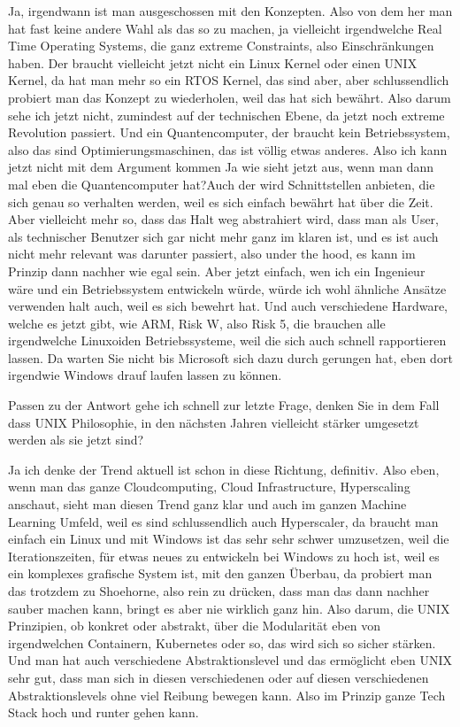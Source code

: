 \begin{description}
\NH Ja, irgendwann ist man ausgeschossen mit den Konzepten. Also von dem her man hat fast keine andere Wahl als das so zu  machen, ja vielleicht irgendwelche Real Time Operating Systems, die ganz extreme Constraints, also Einschränkungen haben. Der braucht vielleicht jetzt nicht ein Linux Kernel oder einen UNIX Kernel, da hat man mehr so ein RTOS Kernel, das sind aber, aber schlussendlich probiert man das Konzept zu wiederholen, weil das hat sich bewährt. Also darum sehe ich jetzt nicht, zumindest auf der technischen Ebene, da jetzt noch extreme Revolution passiert. Und ein Quantencomputer, der braucht kein Betriebssystem, also das sind Optimierungsmaschinen, das ist völlig etwas anderes. Also ich kann jetzt nicht mit dem Argument kommen \glqq Ja wie sieht jetzt aus, wenn man dann mal eben die Quantencomputer hat?\grqq Auch der wird Schnittstellen anbieten, die sich genau so verhalten werden, weil es sich einfach bewährt hat über die Zeit. Aber vielleicht mehr so, dass das Halt weg abstrahiert wird, dass man als User, als technischer Benutzer sich gar nicht mehr ganz im klaren ist, und es ist auch nicht mehr relevant was darunter passiert, also under the hood, es kann im Prinzip dann nachher wie egal sein. Aber jetzt einfach, wen ich ein Ingenieur wäre und ein Betriebssystem entwickeln würde, würde ich wohl ähnliche Ansätze verwenden halt auch, weil es sich bewehrt hat. Und auch verschiedene Hardware, welche es jetzt gibt, wie ARM, Risk W, also Risk 5, die brauchen alle irgendwelche Linuxoiden Betriebssysteme, weil die sich auch schnell rapportieren lassen. Da warten Sie nicht bis Microsoft sich dazu durch gerungen hat, eben dort irgendwie Windows drauf laufen lassen zu können.

\DS Passen zu der Antwort gehe ich schnell zur letzte Frage, denken Sie in dem Fall dass UNIX Philosophie, in den nächsten Jahren vielleicht stärker umgesetzt werden als sie jetzt sind?
 
\NH Ja ich denke der Trend aktuell ist schon in diese Richtung, definitiv. Also eben, wenn man das ganze Cloudcomputing, Cloud Infrastructure, Hyperscaling anschaut, sieht man diesen Trend ganz klar und auch im ganzen Machine Learning Umfeld, weil es sind schlussendlich auch Hyperscaler, da braucht man einfach ein Linux und mit Windows ist das sehr sehr schwer umzusetzen, weil die Iterationszeiten, für etwas neues zu entwickeln bei Windows zu hoch ist, weil es ein komplexes grafische System ist, mit den ganzen Überbau, da probiert man das trotzdem zu Shoehorne, also rein zu drücken, dass man das dann nachher sauber machen kann, bringt es aber nie wirklich ganz hin. Also darum, die UNIX Prinzipien, ob konkret oder abstrakt, über die Modularität eben von irgendwelchen Containern, Kubernetes oder so, das wird sich so sicher stärken. Und man hat auch verschiedene Abstraktionslevel und das ermöglicht eben UNIX sehr gut, dass man sich in diesen verschiedenen oder auf diesen verschiedenen Abstraktionslevels ohne viel Reibung bewegen kann. Also im Prinzip ganze Tech Stack hoch und runter gehen kann.


\end{description}
